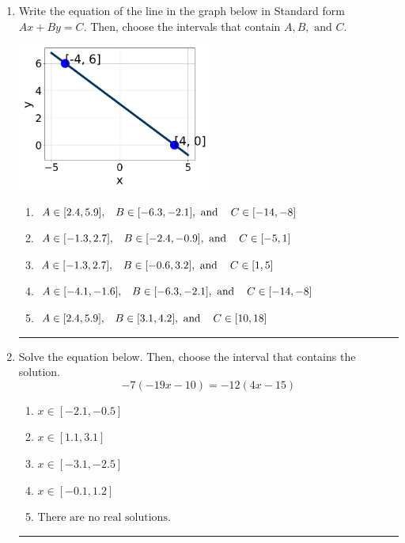 \documentclass[14pt]{extbook}
\newcommand{\litem}[1]{\item#1\hspace*{-1cm}\rule{\textwidth}{0.4pt}}
\begin{document}
\begin{enumerate}
{\begin{enumerate}[label=\Alph*.]
\end{enumerate} }
\litem{
Write the equation of the line in the graph below in Standard form $Ax+By=C$. Then, choose the intervals that contain $A, B, \text{ and } C$.
\begin{center}
    \includegraphics[width=0.5\textwidth]{../Figures/linearGraphToStandardA.png}
\end{center}
\begin{enumerate}[label=\Alph*.]
\item \( A \in [2.4, 5.9], \hspace{3mm} B \in [-6.3, -2.1], \text{ and } \hspace{3mm} C \in [-14, -8] \)
\item \( A \in [-1.3, 2.7], \hspace{3mm} B \in [-2.4, -0.9], \text{ and } \hspace{3mm} C \in [-5, 1] \)
\item \( A \in [-1.3, 2.7], \hspace{3mm} B \in [-0.6, 3.2], \text{ and } \hspace{3mm} C \in [1, 5] \)
\item \( A \in [-4.1, -1.6], \hspace{3mm} B \in [-6.3, -2.1], \text{ and } \hspace{3mm} C \in [-14, -8] \)
\item \( A \in [2.4, 5.9], \hspace{3mm} B \in [3.1, 4.2], \text{ and } \hspace{3mm} C \in [10, 18] \)

\end{enumerate} }
\litem{
Solve the equation below. Then, choose the interval that contains the solution.\[ -7(-19x -10) = -12(4x -15) \]\begin{enumerate}[label=\Alph*.]
\item \( x \in [-2.1, -0.5] \)
\item \( x \in [1.1, 3.1] \)
\item \( x \in [-3.1, -2.5] \)
\item \( x \in [-0.1, 1.2] \)
\item \( \text{There are no real solutions.} \)


\end{enumerate}}
\end{enumerate}
\end{document}
